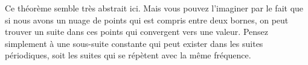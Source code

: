 \documentclass[a4paper, 12pt, french, twoside]{article}
\begin{document}


 

Ce théorème semble très abstrait ici. Mais vous pouvez l'imaginer par le fait que si nous avons un nuage de points qui est compris entre deux bornes, on peut trouver un suite dans ces points qui convergent vers une valeur. Pensez simplement à une sous-suite constante qui peut exister dans les suites périodiques, soit les suites qui se répètent avec la même fréquence.
\end{document}
